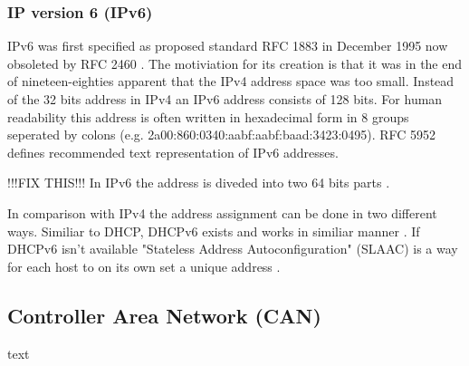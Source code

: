 \subsubsection{IP version 6 (IPv6)}
IPv6 was first specified as proposed standard RFC 1883 \cite{web:rfc1883} in
December 1995 now obsoleted by RFC 2460 \cite{web:rfc2460}. The motiviation for
its creation is that it was in the end of nineteen-eighties apparent that the
IPv4 address space was too small. Instead of the 32 bits address in IPv4 an
IPv6 address consists of 128 bits. For human readability this address is often
written in hexadecimal form in 8 groups seperated by colons
(e.g. 2a00:860:0340:aabf:aabf:baad:3423:0495). RFC 5952 \cite{web:rfc5952}
defines recommended text representation of IPv6 addresses.

!!!FIX THIS!!! In IPv6 the address is diveded into two 64 bits parts \cite{web:rfc4291}.

In comparison with IPv4 the address assignment can be done in two different
ways. Similiar to DHCP, DHCPv6 exists and works in similiar manner
\cite{web:rfc3315}. If DHCPv6 isn't available "Stateless Address
Autoconfiguration" (SLAAC) is a way for each host to on its own set a unique
address \cite{web:rfc4862, web:rfc4941}.


\subsection{Controller Area Network (CAN)}
text
